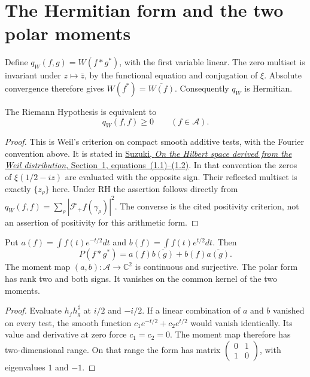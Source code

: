 \section{The Hermitian form and the two polar moments}
\label{v4-arith:w5-a:irreducible-obstruction}

Define $q_W(f,g)=W(f*g^*)$, with the first variable linear.
The zero multiset is invariant under $z\mapsto\bar z$, by the
functional equation and conjugation of $\xi$. Absolute convergence
therefore gives $W(f^*)=\overline{W(f)}$. Consequently $q_W$ is Hermitian.

\begin{corollary}
\label{v4-arith:w5-a:cor:weil-positivity-RH}
The Riemann Hypothesis is equivalent to
\begin{equation}
 q_W(f,f)\ge0\qquad(f\in\mathscr A).
 \label{v4-arith:w5-a:eq:weil-positivity}
\end{equation}
\end{corollary}
\begin{proof}
This is Weil's criterion on compact smooth additive tests, with the
Fourier convention above. It is stated in
\href{https://arxiv.org/html/2301.00421v3#S1}{Suzuki,
\emph{On the Hilbert space derived from the Weil distribution},
Section~1, equations~(1.1)--(1.2)}.
In that convention the zeros of $\xi(1/2-iz)$ are evaluated with
the opposite sign. Their reflected multiset is exactly $\{z_\rho\}$
here. Under RH the assertion follows directly from
$q_W(f,f)=\sum_\rho|\mathcal F_+f(\gamma_\rho)|^2$.
The converse is the cited positivity criterion, not an assertion of
positivity for this arithmetic form.
\end{proof}

\begin{proposition}
\label{v4-arith:w5-a:rem:H3-removable}
Put $a(f)=\int f(t)e^{-t/2}dt$ and $b(f)=\int f(t)e^{t/2}dt$.
Then
\[
 P(f*g^*)=a(f)\overline{b(g)}+b(f)\overline{a(g)}.
\]
The moment map $(a,b):\mathscr A\to\mathbb C^2$ is continuous and
surjective. The polar form has rank two and both signs. It vanishes
on the common kernel of the two moments.
\end{proposition}
\begin{proof}
Evaluate $h_fh_g^\sharp$ at $i/2$ and $-i/2$.
If a linear combination of $a$ and $b$ vanished on every test, the
smooth function $c_1e^{-t/2}+c_2e^{t/2}$ would vanish identically.
Its value and derivative at zero force $c_1=c_2=0$. The moment map
therefore has two-dimensional range. On that range the form has
matrix $\left(\begin{smallmatrix}0&1\\1&0\end{smallmatrix}\right)$,
with eigenvalues $1$ and $-1$.
\end{proof}


